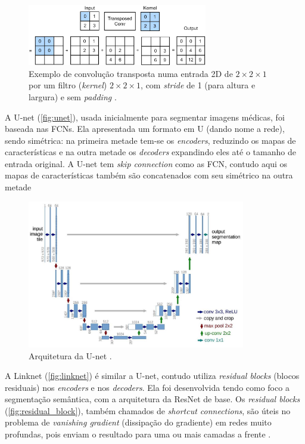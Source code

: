 \documentclass[12pt, a4paper, english, brazil]{article}
\begin{document}
\begin{figure}[htbp]
    \centering
    \includegraphics[width=0.7\textwidth]{img/trans_conv.jpg}
    \caption{Exemplo de convolução transposta numa entrada 2D de $2\times2\times1$ por um filtro (\textit{kernel}) $2\times2\times1$, com \textit{stride} de 1 (para altura e largura) e sem \textit{padding} \cite{Zhang_2021}.}
    \label{fig:transposteConv}
\end{figure}

A U-net (\autoref{fig:unet}), usada inicialmente para segmentar imagens médicas, foi baseada nas FCNs. Ela apresentada um formato em U (dando nome a rede), sendo simétrica: na primeira metade tem-se os \textit{encoders}, reduzindo os mapas de características e na outra metade os \textit{decoders} expandindo eles até o tamanho de entrada original. A U-net tem \textit{skip connection} como as FCN, contudo aqui os mapas de características também são concatenados com seu simétrico na outra metade \cite{Ronneberge_2015, Hao_2020}

\begin{figure}[htbp]
    \centering
    \includegraphics[width=0.85\textwidth]{img/unet.jpg}
    \caption{Arquitetura da U-net \cite{Ronneberge_2015}.}
    \label{fig:unet}
\end{figure}

A Linknet (\autoref{fig:linknet}) é similar a U-net, contudo utiliza \textit{residual blocks} (blocos residuais) nos \textit{encoders} e nos \textit{decoders}. Ela foi desenvolvida tendo como foco a segmentação semântica, com a arquitetura da ResNet de base. Os \textit{residual blocks} (\autoref{fig:residual_block}), também chamados de \textit{shortcut connections}, são úteis no problema de \textit{vanishing gradient} (dissipação do gradiente) em redes muito profundas, pois enviam o resultado para uma ou mais camadas a frente \cite{Chaurasia_2017, Ebrahimi_2021}.
\end{document}
